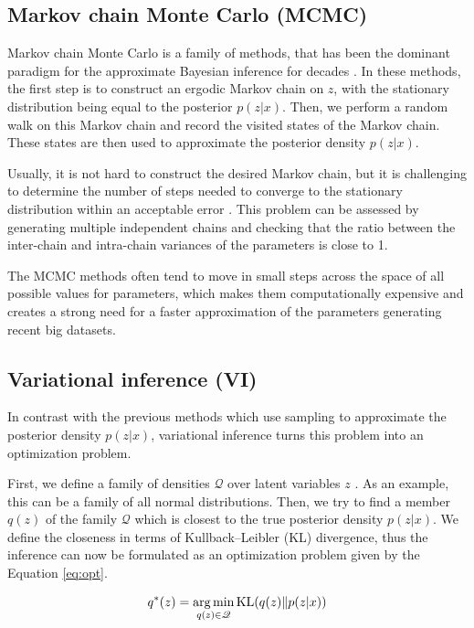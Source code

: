 \subsection{Markov chain Monte Carlo (MCMC)}
Markov chain Monte Carlo is a family of methods, that has been the dominant paradigm for the approximate Bayesian inference for decades \cite{blei2017statreview}.
In these methods, the first step is to construct an ergodic Markov chain on $z$, with the stationary distribution being equal to the posterior $p(z|x)$.
Then, we perform a random walk on this Markov chain and record the visited states of the Markov chain. 
These states are then used to approximate the posterior density $p(z|x)$.

Usually, it is not hard to construct the desired Markov chain, but it is challenging to determine the number of steps needed to converge to the stationary distribution within an acceptable error \cite{gelman1992inference}.
This problem can be assessed by generating multiple independent chains and checking that the ratio between the inter-chain and intra-chain variances of the parameters is close to 1.

The MCMC methods often tend to move in small steps across the space of all possible values for parameters, which makes them computationally expensive and creates a strong need for a faster approximation of the parameters generating recent big datasets.

\subsection{Variational inference (VI)}
In contrast with the previous methods which use sampling to approximate the posterior density $p(z|x)$, variational inference turns this problem into an optimization problem.

First, we define a family of densities $\mathscr{Q}$ over latent variables $z$ \cite{blei2017statreview}.
As an example, this can be a family of all normal distributions.
Then, we try to find a member $q(z)$ of the family $\mathscr{Q}$ which is closest to the true posterior density $p(z|x)$.
We define the closeness in terms of Kullback–Leibler (KL) divergence, thus the inference can now be formulated as an optimization problem given by the Equation \ref{eq:opt}. 

\begin{equation}
    q^{\ast}(z) = \operatorname*{arg\,min}_{q(z) \in \mathscr{Q}} \operatorname{KL}(q(z) \| p(z|x))
    \label{eq:opt}
\end{equation}

